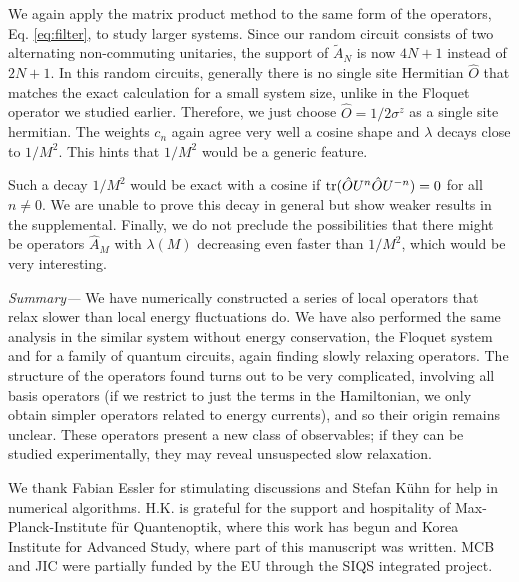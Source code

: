 \documentclass[twocolumn,superscriptaddress, prl,showpacs]{revtex4-1}
\begin{document}
We again apply the matrix product method to the same form of the operators, Eq. \eqref{eq:filter},
to study larger systems. Since our random circuit consists of two alternating non-commuting unitaries,
the support of $\tilde{A}_N$ is now $4N+1$ instead of $2N+1$.
In this random circuits, generally there is no single site Hermitian $\hat{O}$
that matches the exact calculation for a small system size, unlike in the Floquet operator we studied earlier.
Therefore, we just choose $\hat{O} = 1/2\sigma^z$ as a single site hermitian.
The weights $c_n$ again agree very well a cosine shape and $\lambda$ decays close to $1/M^2$.
This hints that $1/M^2$ would be a generic feature.

Such a decay $1/M^2$ would be exact with a cosine if
${\rm tr}(\hat{O} U^n \hat{O} U^{- n})=0$ for all $n \neq 0$.
We are unable to prove this decay in general but show weaker results in the supplemental.
Finally, we do not preclude the possibilities that
there might be operators $\hat{A}_M$ with $\lambda(M)$ decreasing even faster than $1/M^2$,
which would be very interesting.


{\it Summary---}
We have numerically constructed a series of local operators that relax slower than local energy fluctuations do.
We have also performed the same analysis in the similar system without energy conservation,
the Floquet system and for a family of quantum circuits, again finding slowly relaxing operators.
The structure of the operators found turns out to be very complicated, involving all basis operators
(if we restrict to just the terms in the Hamiltonian, we only obtain simpler operators related to energy currents),
and so their origin remains unclear.
These operators present a new class of observables; if they can be studied experimentally, they may reveal unsuspected slow relaxation.

We thank Fabian Essler for stimulating discussions and Stefan K\"{u}hn for help in numerical algorithms.
H.K. is grateful for the support and hospitality of Max-Planck-Institute f\"{u}r Quantenoptik,
where this work has begun and Korea Institute for Advanced Study, where part of this manuscript was written.
MCB and JIC were partially funded by the EU through the SIQS integrated project.



\end{document}
